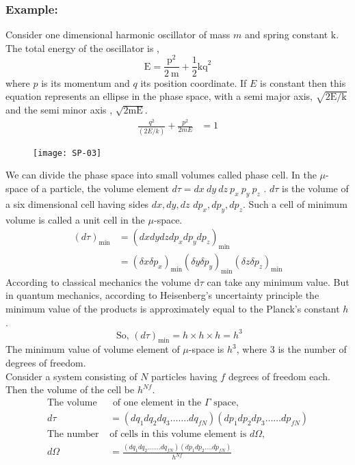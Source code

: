 \subsubsection{Example:}
Consider one dimensional harmonic oscillator of mass $m$ and spring constant $\mathrm{k}$. The total energy of the oscillator is ,
$$\mathrm{E}=\frac{\mathrm{p}^{2}}{2 \mathrm{~m}}+\frac{1}{2} \mathrm{kq}^{2}$$
where $p$ is its momentum and $q$ its position coordinate. If $E$ is constant then this equation represents an ellipse in the phase space, with a semi major axis, $\sqrt{2 \mathrm{E} / \mathrm{k}}$ and the semi minor axis , $\sqrt{2 \mathrm{mE}}$.
\begin{align*}
\frac{q^{2}}{(2 E / k)}+\frac{p^{2}}{2 m E}&=1
\end{align*}
\begin{figure}[H]
	\centering
	\texttt{[image: SP-03]}
\end{figure}
We can divide the phase space into small volumes called phase cell. In the $\mu$-space of a particle, the volume element $d \tau=d x\  d y \ d z\  p_{x}\  p_y \ p_z$ . $d\tau$  is the volume of a six dimensional cell having sides ${d x, d y, d z}$ $d p_{x}, d p_{y}, d p_{z}$. Such a cell of minimum volume is called a unit cell in the $\mu$-space.
\begin{align*}
(d \tau)_{\min }&=\left(d x d y d z d p_{x} d p_{y} d p_{z}\right)_{\min }\\
&=\left(\delta x \delta p_{x}\right)_{\min }\left(\delta y \delta p_{y}\right)_{\min }\left(\delta z \delta p_{z}\right)_{\min }
\end{align*}
According to classical mechanics the volume d$\tau$ can take any minimum value. But in quantum mechanics, according to Heisenberg's uncertainty principle the minimum value of the products is approximately equal to the Planck's constant $h$.
$$\text{ So,  }(d \tau)_{\min }={h} \times {h} \times {h}={h}^{3}$$
The minimum value of volume element of $\mu$-space is $h^{3}$, where 3 is the number of degrees of freedom.\\
 Consider a system consisting of ${N}$ particles having $f$ degrees of freedom each. Then the volume of the cell be ${h}^{{Nf}}$.
\begin{align*}
\text{The volume}&\text{ of one element in the $\Gamma$ space,}\\
d\tau&=\left({dq}_{1} {dq}_{2} {dq}_{3} \ldots \ldots . d {q}_{{fN}}\right)\left({dp}_{1} {dp}_{2} {dp}_{3} \ldots \ldots {dp}_{{fN}}\right)\\
\text{The number }&\text{of cells in this volume element is  $d \Omega$,}
\\
d \Omega&=\frac{\left(d q_{1} d q_{2} \ldots \ldots . d q_{f N}\right)\left(d p_{1} d p_{2} \ldots . d p_{f N}\right)}{h^{N f}}
\end{align*}
